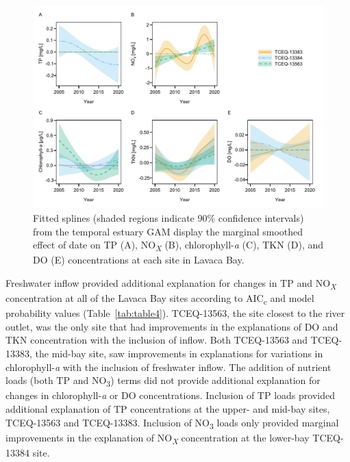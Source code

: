 \documentclass[fleqn,10pt,lineno]{wlpeerj} %
\providecommand{\DIFaddbeginFL}{} %
\providecommand{\DIFaddendFL}{} %
\providecommand{\DIFdelbeginFL}{} %
\providecommand{\DIFdelendFL}{} %
\begin{document}
\begin{figure}

{\centering \DIFdelbeginFL %
\DIFdelendFL \DIFaddbeginFL \includegraphics[width=1\linewidth,]{Schramm-2023-08-PeerJ_files/figure-latex/fig5} 
\DIFaddendFL 

}

\caption{Fitted splines (shaded regions indicate 90\% confidence intervals) from the temporal estuary GAM display the marginal smoothed effect of date on TP (A), NO\textit{\textsubscript{X}} (B), chlorophyll-\textit{a} (C), TKN (D), and DO (E) concentrations at each site in Lavaca Bay.}\label{fig:fig5}
\end{figure}

Freshwater inflow provided additional explanation for changes in TP and
NO\textsubscript{\emph{X}} concentration at all of the Lavaca Bay sites
according to AIC\textsubscript{c} and model probability values
(Table~\ref{tab:table4}). TCEQ-13563, the site closest to the river
outlet, was the only site that had improvements in the explanations of
DO and TKN concentration with the inclusion of inflow. Both TCEQ-13563
and TCEQ-13383, the mid-bay site, saw improvements in explanations for
variations in chlorophyll-\emph{a} with the inclusion of freshwater
inflow. The addition of nutrient loads (both TP and NO\textsubscript{3})
terms did not provide additional explanation for changes in
chlorophyll-\emph{a} or DO concentrations. Inclusion of TP loads
provided additional explanation of TP concentrations at the upper- and
mid-bay sites, TCEQ-13563 and TCEQ-13383. Inclusion of
NO\textsubscript{3} loads only provided marginal improvements in the
explanation of NO\textsubscript{\emph{X}} concentration at the lower-bay
TCEQ-13384 site.
\end{document}
